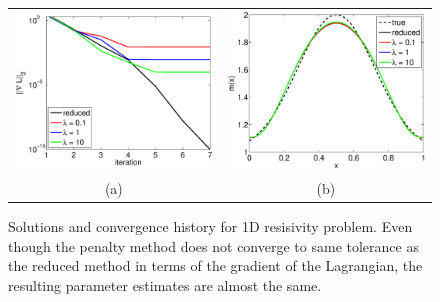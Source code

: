 \documentclass{iopart}
\begin{document}
\begin{figure}
\centering
\begin{tabular}{cc}
\includegraphics[scale=.4]{./figs/1D_exp1_a}&
\includegraphics[scale=.4]{./figs/1D_exp1_b}\\
{\small (a)}&{\small (b)}\\
\end{tabular}
\caption{Solutions and convergence history for 1D resisivity problem. Even though the penalty method does not converge to same tolerance as the reduced method in terms of the gradient of the Lagrangian, the resulting parameter estimates are almost the same.}
\label{fig:1D_exp1}
\end{figure}
\end{document}
